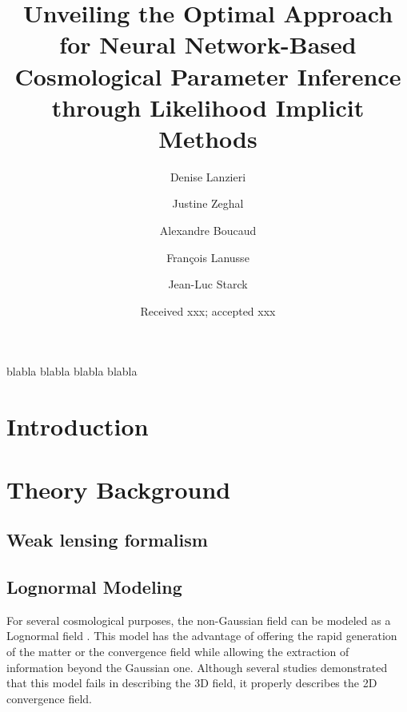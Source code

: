 \documentclass{aa}
\begin{document}
 

\title{Unveiling the Optimal Approach for Neural Network-Based Cosmological Parameter Inference through Likelihood Implicit Methods}





\author{Denise Lanzieri 
\and
Justine Zeghal 
\and
Alexandre Boucaud 
\and
Fran\c{c}ois Lanusse 
\and
Jean-Luc Starck 
}
\titlerunning{}
\date{Received xxx; accepted xxx}


 
  \abstract
   {blabla}
    {blabla}
    {blabla}
   {blabla}
   {}


   \maketitle
%

\section{Introduction}
\section{Theory Background}
\subsection{Weak lensing formalism}
\subsection{Lognormal Modeling}
For several cosmological purposes, the non-Gaussian field can be modeled as a Lognormal field \citep{coles1991lognormal,bohm2017bayesian}.
This model has the advantage of offering the rapid generation of the matter or the convergence field while allowing the extraction of information beyond the Gaussian one. 
Although several studies demonstrated that this model fails in describing the 3D field, it properly describes the 2D convergence field.
\end{document}
